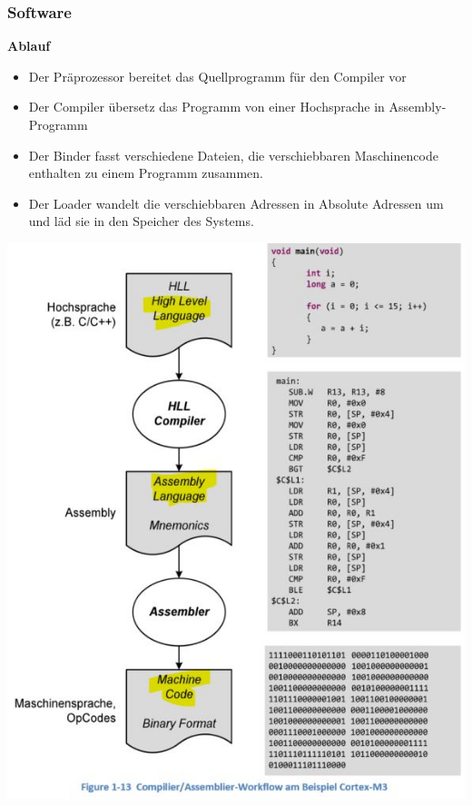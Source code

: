 \subsubsection{Software}
\begin{multicols}{2}
\textbf{Ablauf}\newline
\begin{itemize}
    \item Der Präprozessor bereitet das Quellprogramm für den Compiler vor
    \item Der Compiler übersetz das Programm von einer Hochsprache in Assembly-Programm
    \item Der Binder fasst verschiedene Dateien, die verschiebbaren Maschinencode enthalten zu einem Programm zusammen.
    \item Der Loader wandelt die verschiebbaren Adressen in Absolute Adressen um und läd sie in den Speicher des Systems.
\end{itemize}

\includegraphics{images/CompilerWorkflow}
\end{multicols}

